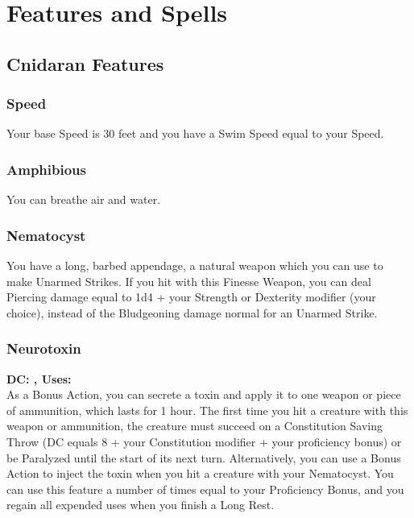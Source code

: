 \documentclass[letterpaper,openany,oneside,twocolumn]{book}
\begin{document}
\onecolumn


\rendercharactersheet

\renderbackgroundsheet

\renderspellsheet



\restoregeometry
\twocolumn

\chapter*{Features and Spells}

\section*{Cnidaran Features}
\subsection*{Speed}
Your base Speed is 30 feet and you have a Swim Speed equal to your Speed.
\subsection*{Amphibious}
You can breathe air and water.
\subsection*{Nematocyst}
You have a long, barbed appendage, a natural weapon which you can use to make Unarmed Strikes. If you hit with this Finesse Weapon, you can deal Piercing damage equal to 1d4 + your Strength or Dexterity modifier (your choice), instead of the Bludgeoning damage normal for an Unarmed Strike.
\subsection*{Neurotoxin}
\textbf{DC: , Uses: }\\
As a Bonus Action, you can secrete a toxin and apply it to one weapon or piece of ammunition, which lasts for 1 hour. The first time you hit a creature with this weapon or ammunition, the creature must succeed on a Constitution Saving Throw (DC equals 8 + your Constitution modifier + your proficiency bonus) or be Paralyzed until the start of its next turn. Alternatively, you can use a Bonus Action to inject the toxin when you hit a creature with your Nematocyst. You can use this feature a number of times equal to your Proficiency Bonus, and you regain all expended uses when you finish a Long Rest.
\end{document}
